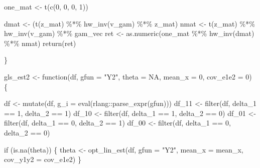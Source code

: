 \documentclass[
  letterpaper,
  DIV=11,
  numbers=noendperiod]{scrartcl}
\newenvironment{Shaded}{\begin{snugshade}}{\end{snugshade}}
\newcommand{\AttributeTok}[1]{\textcolor[rgb]{0.40,0.45,0.13}{#1}}
\newcommand{\ConstantTok}[1]{\textcolor[rgb]{0.56,0.35,0.01}{#1}}
\newcommand{\ControlFlowTok}[1]{\textcolor[rgb]{0.00,0.23,0.31}{#1}}
\newcommand{\DecValTok}[1]{\textcolor[rgb]{0.68,0.00,0.00}{#1}}
\newcommand{\FunctionTok}[1]{\textcolor[rgb]{0.28,0.35,0.67}{#1}}
\newcommand{\NormalTok}[1]{\textcolor[rgb]{0.00,0.23,0.31}{#1}}
\newcommand{\OtherTok}[1]{\textcolor[rgb]{0.00,0.23,0.31}{#1}}
\newcommand{\SpecialCharTok}[1]{\textcolor[rgb]{0.37,0.37,0.37}{#1}}
\newcommand{\StringTok}[1]{\textcolor[rgb]{0.13,0.47,0.30}{#1}}
\begin{document}
\begin{Shaded}
\begin{Highlighting}[]
\NormalTok{  one\_mat }\OtherTok{\textless{}{-}} \FunctionTok{t}\NormalTok{(}\FunctionTok{c}\NormalTok{(}\DecValTok{0}\NormalTok{, }\DecValTok{0}\NormalTok{, }\DecValTok{0}\NormalTok{, }\DecValTok{1}\NormalTok{))}

\NormalTok{  dmat }\OtherTok{\textless{}{-}}\NormalTok{ (}\FunctionTok{t}\NormalTok{(z\_mat) }\SpecialCharTok{\%*\%} \FunctionTok{hw\_inv}\NormalTok{(v\_gam) }\SpecialCharTok{\%*\%}\NormalTok{ z\_mat)}
\NormalTok{  nmat }\OtherTok{\textless{}{-}} \FunctionTok{t}\NormalTok{(z\_mat) }\SpecialCharTok{\%*\%} \FunctionTok{hw\_inv}\NormalTok{(v\_gam) }\SpecialCharTok{\%*\%}\NormalTok{ gam\_vec}
\NormalTok{  ret }\OtherTok{\textless{}{-}} \FunctionTok{as.numeric}\NormalTok{(one\_mat }\SpecialCharTok{\%*\%} \FunctionTok{hw\_inv}\NormalTok{(dmat) }\SpecialCharTok{\%*\%}\NormalTok{ nmat)}
  \FunctionTok{return}\NormalTok{(ret)}

\NormalTok{\}}

\NormalTok{gls\_est2 }\OtherTok{\textless{}{-}} \ControlFlowTok{function}\NormalTok{(df, }\AttributeTok{gfun =} \StringTok{"Y2"}\NormalTok{, }\AttributeTok{theta =} \ConstantTok{NA}\NormalTok{, }\AttributeTok{mean\_x =} \DecValTok{0}\NormalTok{, }\AttributeTok{cov\_e1e2 =} \DecValTok{0}\NormalTok{) \{}

\NormalTok{  df }\OtherTok{\textless{}{-}} \FunctionTok{mutate}\NormalTok{(df, }\AttributeTok{g\_i =} \FunctionTok{eval}\NormalTok{(rlang}\SpecialCharTok{::}\FunctionTok{parse\_expr}\NormalTok{(gfun)))}
\NormalTok{  df\_11 }\OtherTok{\textless{}{-}} \FunctionTok{filter}\NormalTok{(df, delta\_1 }\SpecialCharTok{==} \DecValTok{1}\NormalTok{, delta\_2 }\SpecialCharTok{==} \DecValTok{1}\NormalTok{)}
\NormalTok{  df\_10 }\OtherTok{\textless{}{-}} \FunctionTok{filter}\NormalTok{(df, delta\_1 }\SpecialCharTok{==} \DecValTok{1}\NormalTok{, delta\_2 }\SpecialCharTok{==} \DecValTok{0}\NormalTok{)}
\NormalTok{  df\_01 }\OtherTok{\textless{}{-}} \FunctionTok{filter}\NormalTok{(df, delta\_1 }\SpecialCharTok{==} \DecValTok{0}\NormalTok{, delta\_2 }\SpecialCharTok{==} \DecValTok{1}\NormalTok{)}
\NormalTok{  df\_00 }\OtherTok{\textless{}{-}} \FunctionTok{filter}\NormalTok{(df, delta\_1 }\SpecialCharTok{==} \DecValTok{0}\NormalTok{, delta\_2 }\SpecialCharTok{==} \DecValTok{0}\NormalTok{)}

  \ControlFlowTok{if}\NormalTok{ (}\FunctionTok{is.na}\NormalTok{(theta)) \{}
\NormalTok{    theta }\OtherTok{\textless{}{-}} \FunctionTok{opt\_lin\_est}\NormalTok{(df, }\AttributeTok{gfun =} \StringTok{"Y2"}\NormalTok{, }\AttributeTok{mean\_x =}\NormalTok{ mean\_x, }\AttributeTok{cov\_y1y2 =}\NormalTok{ cov\_e1e2)}
\NormalTok{  \}}


\end{Highlighting}
\end{Shaded}
\end{document}
